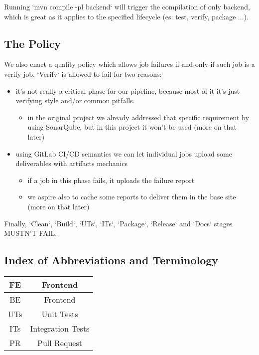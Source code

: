 \documentclass[a4paper,10pt]{scrartcl}
\begin{document}
Running `mvn compile -pl backend` will trigger the compilation of only backend, which is great as it applies to the specified lifecycle (es: test, verify, package ...).

\subsection{The Policy}

We also enact a quality policy which allows job failures if-and-only-if such job is a verify job. `Verify` is allowed to fail for two reasons:
\begin{itemize}
    \item it's not really a critical phase for our pipeline, because most of it it's just verifying style and/or common pitfalls.
    \begin{itemize}
        \item in the original project we already addressed that specific requirement by using SonarQube, but in this project it won't be used (more on that later)
    \end{itemize}
    \item using GitLab CI/CD semantics we can let individual jobs upload some deliverables with artifacts mechanics
    \begin{itemize}
        \item if a job in this phase fails, it uploads the failure report
        \item we aspire also to cache some reports to deliver them in the base site (more on that later)
    \end{itemize}
\end{itemize}

Finally, `Clean`, `Build`, `UTs`, `ITs`, `Package`, `Release` and `Docs` stages MUSTN'T FAIL.

\subsection{Index of Abbreviations and Terminology}

\begin{center}
    \begin{tabular}{|c|c|}
         \hline
         FE & Frontend \\
         \hline
         BE & Frontend \\
         \hline
         UTs & Unit Tests \\
         \hline
         ITs & Integration Tests \\
         \hline
         PR & Pull Request \\
         \hline
    \end{tabular}
\end{center}
\end{document}
